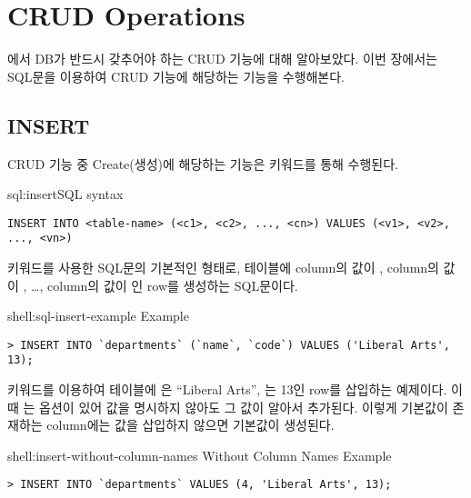 \section{CRUD Operations}\label{sect:crud-operations}

에서 DB가 반드시 갖추어야 하는 CRUD 기능에 대해 알아보았다. 이번 장에서는 SQL문을 이용하여 CRUD 기능에 해당하는 기능을 수행해본다.

\subsection*{INSERT}

CRUD 기능 중 Create(생성)에 해당하는 기능은  키워드를 통해 수행된다.

\begin{sqlenv}{sql:insert}{SQL  syntax}\begin{verbatim}
INSERT INTO <table-name> (<c1>, <c2>, ..., <cn>) VALUES (<v1>, <v2>, ..., <vn>)
\end{verbatim}
\end{sqlenv}

\는  키워드를 사용한 SQL문의 기본적인 형태로,  테이블에  column의 값이 ,  column의 값이 , \ldots,  column의 값이 인 row를 생성하는 SQL문이다.

\begin{shellenv}{shell:sql-insert-example}{ Example}\begin{verbatim}
> INSERT INTO `departments` (`name`, `code`) VALUES ('Liberal Arts', 13);
\end{verbatim}
\end{shellenv}

\은  키워드를 이용하여  테이블에 은 ``Liberal Arts'', 는 13인 row를 삽입하는 예제이다. 이때 는  옵션이 있어 값을 명시하지 않아도 그 값이 알아서 추가된다. 이렇게 기본값이 존재하는 column에는 값을 삽입하지 않으면 기본값이 생성된다.

\begin{shellenv}{shell:insert-without-column-names}{ Without Column Names Example}\begin{verbatim}
> INSERT INTO `departments` VALUES (4, 'Liberal Arts', 13);
\end{verbatim}
\end{shellenv}

